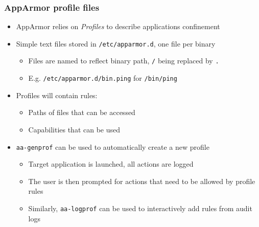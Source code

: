 \begin{frame}
	\frametitle{AppArmor profile files}
	\begin{itemize}
		\item AppArmor relies on \emph{Profiles} to describe applications confinement
		\item Simple text files stored in \texttt{/etc/apparmor.d}, one file per
			binary
			\begin{itemize}
				\item Files are named to reflect binary path, \texttt{/} being replaced
					by \texttt{.}
				\item E.g. \texttt{/etc/apparmor.d/bin.ping} for \texttt{/bin/ping}
			\end{itemize}
		\item Profiles will contain rules:
			\begin{itemize}
				\item Paths of files that can be accessed
				\item Capabilities that can be used
			\end{itemize}
		\item \texttt{aa-genprof} can be used to automatically create a new profile
			\begin{itemize}
				\item Target application is launched, all actions are logged
				\item The user is then prompted for actions that need to be allowed by
					profile rules
				\item Similarly, \texttt{aa-logprof} can be used to interactively add
					rules from audit logs
			\end{itemize}
	\end{itemize}
\end{frame}

